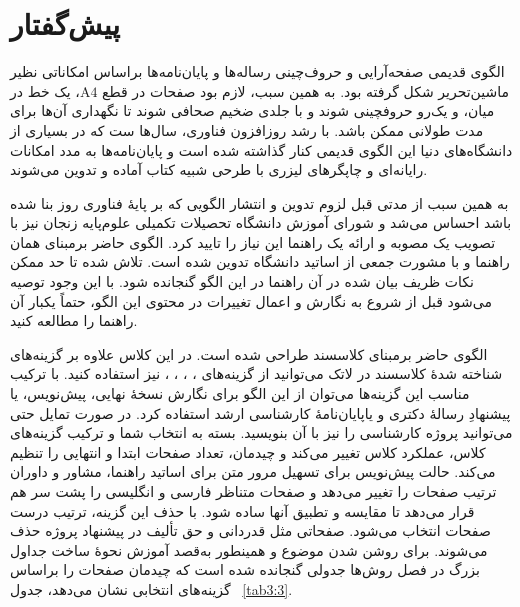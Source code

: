\section*{پیش‌گفتار}
\thispagestyle{plain} %
الگوی قدیمی صفحه‌آرایی و حروف‌چینی رساله‌ها و پایان‌نامه‌ها براساس امکاناتی نظیر ماشین‌تحریر شکل گرفته بود. به همین سبب، لازم بود صفحات در قطع 
$\mathrm{A4}$، 
یک خط در میان، و یک‌رو حروفچینی شوند و با جلدی ضخیم صحافی شوند تا نگهداری آن‌ها برای مدت طولانی ممکن باشد. با رشد روزافزون فناوری، سال‌ها ست که در بسیاری از دانشگاه‌های دنیا این الگوی قدیمی کنار گذاشته شده است و پایان‌نامه‌ها به مدد امکانات رایانه‌ای و چاپگرهای لیزری با طرحی شبیه کتاب آماده و تدوین می‌شوند.

به همین سبب از مدتی قبل لزوم تدوین و انتشار الگویی که بر پایهٔ فناوری روز بنا شده باشد احساس می‌شد و شورای آموزش دانشگاه تحصیلات تکمیلی علوم‌پایه زنجان نیز با تصویب یک مصوبه و ارائه یک راهنما این نیاز را تایید کرد. الگوی حاضر برمبنای همان راهنما و با مشورت جمعی از اساتید دانشگاه تدوین شده است. تلاش شده تا حد ممکن نکات ظریف بیان شده در آن راهنما در این الگو گنجانده شود. با این وجود توصیه می‌شود قبل از شروع به نگارش 
\thesis 
و اعمال تغییرات در محتوی این الگو، حتماً یکبار آن راهنما را مطالعه کنید.

الگوی حاضر برمبنای کلاس\dash سند 
طراحی شده است. در این کلاس علاوه بر گزینه‌های شناخته شدهٔ کلاس\dash سند
در لاتک می‌توانید از گزینه‌های 
، ، ، ، 
نیز استفاده کنید. با ترکیب مناسب این گزینه‌ها می‌توان از این الگو برای نگارش نسخهٔ نهایی، پیش‌نویس، یا پیشنهادِ رسالهٔ دکتری و یاپایان‌نامهٔ کارشناسی ارشد استفاده کرد. در صورت تمایل حتی می‌توانید پروژه کارشناسی را نیز با آن بنویسید. بسته به انتخاب شما و ترکیب گزینه‌های کلاس، عملکرد کلاس تغییر می‌کند و چیدمان، تعداد صفحات ابتدا و انتهایی را تنظیم می‌کند. حالت پیش‌نویس برای تسهیل مرور متن 
\thesis 
برای اساتید راهنما، مشاور و داوران ترتیب صفحات را تغییر می‌دهد و صفحات متناظر فارسی و انگلیسی را پشت سر هم قرار می‌دهد تا مقایسه و تطبیق آنها ساده شود. با حذف این گزینه، ترتیب درست صفحات انتخاب می‌شود. صفحاتی مثل قدردانی و حق تألیف در پیشنهاد پروژه حذف می‌شوند. برای روشن شدن موضوع و همینطور به‌قصد آموزش نحوهٔ ساخت جداول بزرگ در فصل روش‌ها جدولی گنجانده شده است که چیدمان صفحات را براساس گزینه‌های انتخابی نشان می‌دهد، جدول~
\ref{tab3:3}.

